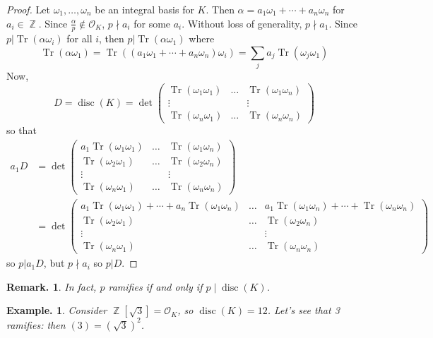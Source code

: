 \documentclass[11pt, a4paper]{memoir}
\DeclareMathOperator{\Z}{{\mathbb{Z}}}
\theoremstyle{change}
\theoremstyle{plain}
\theoremstyle{nonumberplain}
\newtheorem{example}{Example.}
\newtheorem{remark}{Remark.}
\newtheorem{proof}{Proof}
\DeclareMathOperator{\disc}{disc}
\DeclareMathOperator{\Tr}{Tr}
\numberwithin{equation}{section}
\begin{document}
\begin{proof}
    Let $\omega_1,\ldots,\omega_n$ be an integral basis for $K$.
    Then $\alpha=a_1\omega_1+\cdots+a_n\omega_n$ for $a_i\in\Z$.
    Since $\frac{\alpha}{p}\notin\mathcal{O}_K$, $p\nmid a_i$ for some $a_i$.
    Without loss of generality, $p\nmid a_1$.
    Since $p|\Tr(\alpha\omega_i)$ for all $i$, then $p|\Tr(\alpha\omega_1)$ where
    \begin{equation*}
        \Tr(\alpha\omega_1)=\Tr((a_1\omega_1+\cdots+a_n\omega_n)\omega_i)=\sum_j a_j\Tr(\omega_j\omega_1)
    \end{equation*}
    Now,
    \begin{equation*}
        D=\disc(K)=\det
        \begin{pmatrix}
            \Tr(\omega_1\omega_1) &\hdots&\Tr(\omega_1\omega_n)\\
            \vdots&&\vdots\\
            \Tr(\omega_n\omega_1) &\hdots&\Tr(\omega_n\omega_n)
        \end{pmatrix}
    \end{equation*}
    so that
    \begin{align*}
        a_1D &=\det
        \begin{pmatrix}
            a_1\Tr(\omega_1\omega_1) &\hdots&\Tr(\omega_1\omega_n)\\
            \Tr(\omega_2\omega_1) &\hdots&\Tr(\omega_2\omega_n)\\
            \vdots&&\vdots\\
            \Tr(\omega_n\omega_1) &\hdots&\Tr(\omega_n\omega_n)
        \end{pmatrix}\\
        &=\det
        \begin{pmatrix}
            a_1\Tr(\omega_1\omega_1)+\cdots+a_n\Tr(\omega_1\omega_n) &\hdots &a_1\Tr(\omega_1\omega_n)+\cdots+\Tr(\omega_n\omega_n)\\
            \Tr(\omega_2\omega_1) &\hdots&\Tr(\omega_2\omega_n)\\
            \vdots&&\vdots\\
            \Tr(\omega_n\omega_1) &\hdots&\Tr(\omega_n\omega_n)
        \end{pmatrix}
    \end{align*}
    so $p|a_1D$, but $p\nmid a_i$ so $p|D$.
\end{proof}
\begin{remark}
    In fact, $p$ ramifies if and only if $p\mid\disc(K)$.
\end{remark}
\begin{example}
    Consider $\Z[\sqrt{3}]=\mathcal{O}_K$, so $\disc(K)=12$.
    Let's see that 3 ramifies: then $(3)=(\sqrt{3})^2$.
\end{example}
\end{document}
